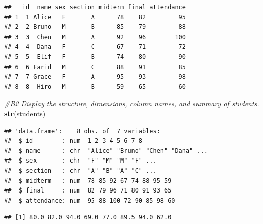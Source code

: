 \documentclass[
]{article}
\newenvironment{Shaded}{\begin{snugshade}}{\end{snugshade}}
\newcommand{\CommentTok}[1]{\textcolor[rgb]{0.56,0.35,0.01}{\textit{#1}}}
\newcommand{\DecValTok}[1]{\textcolor[rgb]{0.00,0.00,0.81}{#1}}
\newcommand{\FunctionTok}[1]{\textcolor[rgb]{0.13,0.29,0.53}{\textbf{#1}}}
\newcommand{\NormalTok}[1]{#1}
\newcommand{\OtherTok}[1]{\textcolor[rgb]{0.56,0.35,0.01}{#1}}
\newcommand{\SpecialCharTok}[1]{\textcolor[rgb]{0.81,0.36,0.00}{\textbf{#1}}}
\begin{document}
\begin{verbatim}
##   id  name sex section midterm final attendance
## 1  1 Alice   F       A      78    82         95
## 2  2 Bruno   M       B      85    79         88
## 3  3  Chen   M       A      92    96        100
## 4  4  Dana   F       C      67    71         72
## 5  5  Elif   F       B      74    80         90
## 6  6 Farid   M       C      88    91         85
## 7  7 Grace   F       A      95    93         98
## 8  8  Hiro   M       B      59    65         60
\end{verbatim}

\begin{Shaded}
\begin{Highlighting}[]
\CommentTok{\#B2 Display the structure, dimensions, column names, and summary of students.}
\FunctionTok{str}\NormalTok{(students)}
\end{Highlighting}
\end{Shaded}

\begin{verbatim}
## 'data.frame':    8 obs. of  7 variables:
##  $ id        : num  1 2 3 4 5 6 7 8
##  $ name      : chr  "Alice" "Bruno" "Chen" "Dana" ...
##  $ sex       : chr  "F" "M" "M" "F" ...
##  $ section   : chr  "A" "B" "A" "C" ...
##  $ midterm   : num  78 85 92 67 74 88 95 59
##  $ final     : num  82 79 96 71 80 91 93 65
##  $ attendance: num  95 88 100 72 90 85 98 60
\end{verbatim}

\begin{Shaded}
\end{Shaded}

\begin{verbatim}
## [1] 80.0 82.0 94.0 69.0 77.0 89.5 94.0 62.0
\end{verbatim}

\begin{Shaded}
\end{Shaded}
\end{document}
